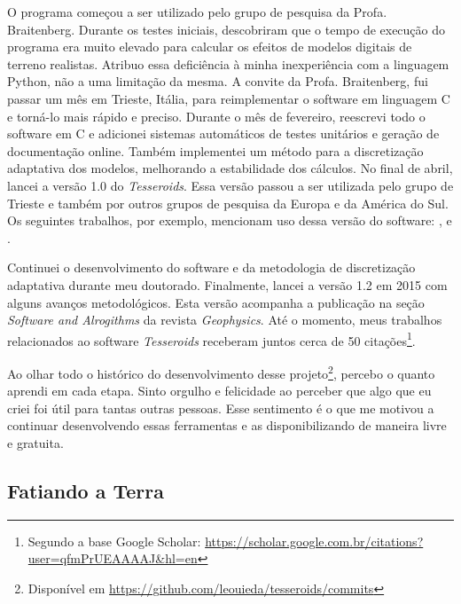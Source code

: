 \documentclass[12pt,a4paper,oneside,titlepage,onecolumn]{article}
\begin{document}
O programa começou a ser utilizado pelo grupo de pesquisa da Profa.
Braitenberg.
Durante os testes iniciais, descobriram que o tempo de execução do programa era
muito elevado para calcular os efeitos de modelos digitais de terreno
realistas.
Atribuo essa deficiência à minha inexperiência com a linguagem Python, não a
uma limitação da mesma.
A convite da Profa. Braitenberg, fui passar um mês em Trieste, Itália,
para reimplementar o software em linguagem C e torná-lo mais rápido e preciso.
Durante o mês de fevereiro, reescrevi todo o software em C e adicionei
sistemas automáticos de testes unitários e geração de documentação online.
Também implementei um método para a discretização adaptativa dos modelos,
melhorando a estabilidade dos cálculos.
No final de abril, lancei a versão 1.0 do \textit{Tesseroids}.
Essa versão passou a ser utilizada pelo grupo de Trieste e também por outros
grupos de pesquisa da Europa e da América do Sul.
Os seguintes trabalhos, por exemplo, mencionam uso dessa versão do software:
\citet{alvarez2012}, \citet{mariani2013} e \citet{bouman2013}.

Continuei o desenvolvimento do software e da metodologia de discretização
adaptativa durante meu doutorado.
Finalmente, lancei a versão 1.2 em 2015 com alguns avanços metodológicos.
Esta versão acompanha a publicação \citet{tesseroids} na seção \textit{Software
and Alrogithms} da revista \textit{Geophysics}.
Até o momento, meus trabalhos relacionados ao software \textit{Tesseroids}
receberam juntos cerca de 50 citações\footnote{Segundo a base Google Scholar:
\url{https://scholar.google.com.br/citations?user=qfmPrUEAAAAJ&hl=en}}.

Ao olhar todo o histórico do desenvolvimento desse
projeto\footnote{Disponível em
\url{https://github.com/leouieda/tesseroids/commits}},
percebo o quanto aprendi em cada etapa.
Sinto orgulho e felicidade ao perceber que algo que eu criei foi útil para
tantas outras pessoas.
Esse sentimento é o que me motivou a continuar desenvolvendo essas ferramentas
e as disponibilizando de maneira livre e gratuita.



\subsection{Fatiando a Terra}
\end{document}
